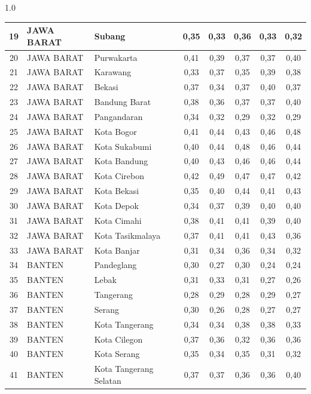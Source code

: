 \begin{spacing}{1.0}
\begin{longtable}{|c|p{2.2cm}|p{2.8cm}|c|c|c|c|c|}
19 & JAWA BARAT & Subang & 0,35 & 0,33 & 0,36 & 0,33 & 0,32 \\ \hline
20 & JAWA BARAT & Purwakarta & 0,41 & 0,39 & 0,37 & 0,37 & 0,40 \\ \hline
21 & JAWA BARAT & Karawang & 0,33 & 0,37 & 0,35 & 0,39 & 0,38 \\ \hline
22 & JAWA BARAT & Bekasi & 0,37 & 0,34 & 0,37 & 0,40 & 0,37 \\ \hline
23 & JAWA BARAT & Bandung Barat & 0,38 & 0,36 & 0,37 & 0,37 & 0,40 \\ \hline
24 & JAWA BARAT & Pangandaran & 0,34 & 0,32 & 0,29 & 0,32 & 0,29 \\ \hline
25 & JAWA BARAT & Kota Bogor & 0,41 & 0,44 & 0,43 & 0,46 & 0,48 \\ \hline
26 & JAWA BARAT & Kota Sukabumi & 0,40 & 0,44 & 0,48 & 0,46 & 0,44 \\ \hline
27 & JAWA BARAT & Kota Bandung & 0,40 & 0,43 & 0,46 & 0,46 & 0,44 \\ \hline
28 & JAWA BARAT & Kota Cirebon & 0,42 & 0,49 & 0,47 & 0,47 & 0,42 \\ \hline
29 & JAWA BARAT & Kota Bekasi & 0,35 & 0,40 & 0,44 & 0,41 & 0,43 \\ \hline
30 & JAWA BARAT & Kota Depok & 0,34 & 0,37 & 0,39 & 0,40 & 0,40 \\ \hline
31 & JAWA BARAT & Kota Cimahi & 0,38 & 0,41 & 0,41 & 0,39 & 0,40 \\ \hline
32 & JAWA BARAT & Kota Tasikmalaya & 0,37 & 0,41 & 0,41 & 0,43 & 0,36 \\ \hline
33 & JAWA BARAT & Kota Banjar & 0,31 & 0,34 & 0,36 & 0,34 & 0,32 \\ \hline
34 & BANTEN & Pandeglang & 0,30 & 0,27 & 0,30 & 0,24 & 0,24 \\ \hline
35 & BANTEN & Lebak & 0,31 & 0,33 & 0,31 & 0,27 & 0,26 \\ \hline
36 & BANTEN & Tangerang & 0,28 & 0,29 & 0,28 & 0,29 & 0,27 \\ \hline
37 & BANTEN & Serang & 0,30 & 0,26 & 0,28 & 0,27 & 0,27 \\ \hline
38 & BANTEN & Kota Tangerang & 0,34 & 0,34 & 0,38 & 0,38 & 0,33 \\ \hline
39 & BANTEN & Kota Cilegon & 0,37 & 0,36 & 0,32 & 0,36 & 0,36 \\ \hline
40 & BANTEN & Kota Serang & 0,35 & 0,34 & 0,35 & 0,31 & 0,32 \\ \hline
41 & BANTEN & Kota Tangerang Selatan & 0,37 & 0,37 & 0,36 & 0,36 & 0,40 \\ \hline
\end{longtable}
\end{spacing}
\newpage
